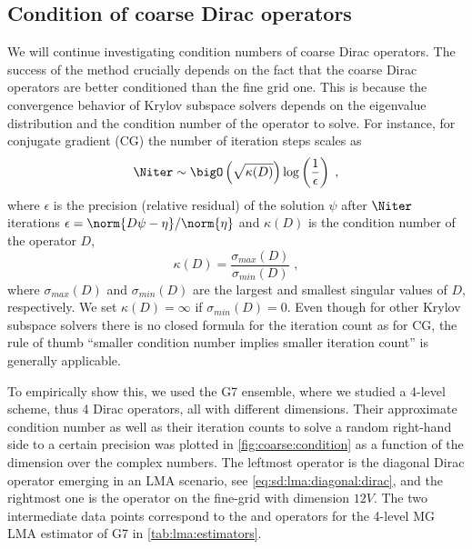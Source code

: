 \subsection{Condition of coarse Dirac operators}
\label{sec:numerics:coarse:condition}

We will continue investigating condition numbers of coarse Dirac operators.
The success of the method crucially depends on the fact that the coarse Dirac operators are better conditioned than the fine grid one.
This is because the convergence behavior of Krylov subspace solvers depends on the eigenvalue distribution and the condition number of the operator to solve.
For instance, for conjugate gradient (CG) the number of iteration steps scales as~\cite{shewchuk1994introduction}
\begin{equation}
\Niter \sim \bigO\left(\sqrt{\kappa(D)}\right) \log\left(\frac{1}{\epsilon}\right) \;,
\end{equation}
where $\epsilon$ is the precision (relative residual) of the solution $\psi$ after $\Niter$ iterations $\epsilon = \norm{D \psi - \eta}/\norm{\eta}$ and $\kappa(D)$ is the condition number of the operator $D$,
\begin{equation}
\kappa(D) = \frac{ \sigma_{max}(D) }{ \sigma_{min}(D) } \;,
\end{equation}
where $\sigma_{max}(D)$ and $\sigma_{min}(D)$ are the largest and smallest singular values of $D$, respectively.
We set $\kappa(D) = \infty$ if $\sigma_{min}(D) = 0$.
Even though for other Krylov subspace solvers there is no closed formula for the iteration count as for CG, the rule of thumb ``smaller condition number implies smaller iteration count'' is generally applicable.

To empirically show this, we used the G7 ensemble, where we studied a 4-level scheme, thus \num{4} Dirac operators, all with different dimensions.
Their approximate condition number as well as their iteration counts to solve a random right-hand side to a certain precision was plotted in \cref{fig:coarse:condition} as a function of the dimension over the complex numbers.
The leftmost operator is the diagonal Dirac operator emerging in an LMA scenario, see \cref{eq:sd:lma:diagonal:dirac}, and the rightmost one is the operator on the fine-grid with dimension $12 V$.
The two intermediate data points correspond to the  and  operators for the 4-level MG LMA estimator of G7 in \cref{tab:lma:estimators}.

